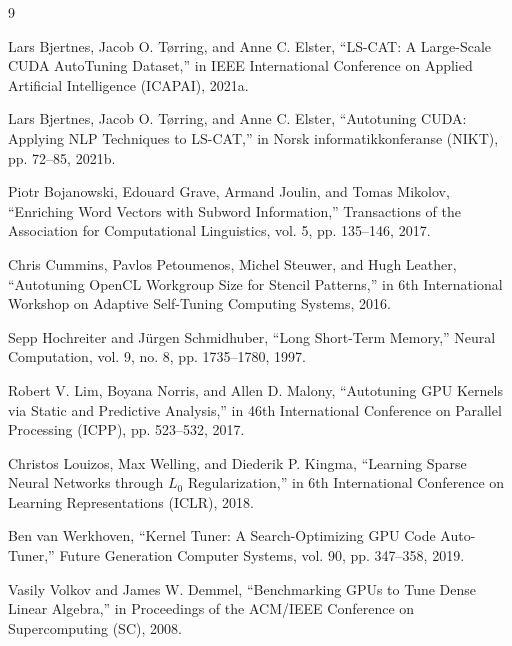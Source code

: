\documentclass[11pt,letterpaper]{article}
\begin{document}
\begin{thebibliography}{9}
\small

Lars Bjertnes, Jacob O. Tørring, and Anne C. Elster, ``LS-CAT: A Large-Scale CUDA AutoTuning Dataset,'' in
IEEE International Conference on Applied Artificial Intelligence (ICAPAI), 2021a.

Lars Bjertnes, Jacob O. Tørring, and Anne C. Elster, ``Autotuning CUDA: Applying NLP Techniques to LS-CAT,''
in Norsk informatikkonferanse (NIKT), pp. 72--85, 2021b.

Piotr Bojanowski, Edouard Grave, Armand Joulin, and Tomas Mikolov, ``Enriching Word Vectors with Subword
Information,'' Transactions of the Association for Computational Linguistics, vol. 5, pp. 135--146, 2017.

Chris Cummins, Pavlos Petoumenos, Michel Steuwer, and Hugh Leather, ``Autotuning OpenCL Workgroup Size for
Stencil Patterns,'' in 6th International Workshop on Adaptive Self-Tuning Computing Systems, 2016.

Sepp Hochreiter and Jürgen Schmidhuber, ``Long Short-Term Memory,'' Neural Computation, vol. 9, no. 8, pp.
1735--1780, 1997.

Robert V. Lim, Boyana Norris, and Allen D. Malony, ``Autotuning GPU Kernels via Static and Predictive
Analysis,'' in 46th International Conference on Parallel Processing (ICPP), pp. 523--532, 2017.

Christos Louizos, Max Welling, and Diederik P. Kingma, ``Learning Sparse Neural Networks through \(L_0\)
Regularization,'' in 6th International Conference on Learning Representations (ICLR), 2018.

Ben van Werkhoven, ``Kernel Tuner: A Search-Optimizing GPU Code Auto-Tuner,'' Future Generation Computer
Systems, vol. 90, pp. 347--358, 2019.

Vasily Volkov and James W. Demmel, ``Benchmarking GPUs to Tune Dense Linear Algebra,'' in Proceedings of the
ACM/IEEE Conference on Supercomputing (SC), 2008.

\end{thebibliography}
\end{document}
